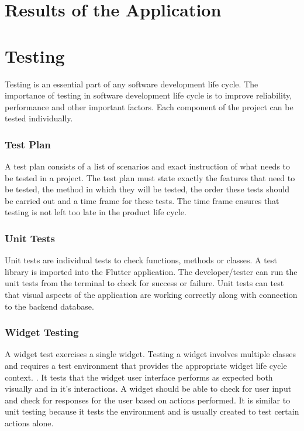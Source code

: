 \section{Results of the Application}

\section{Testing}
Testing is an essential part of any software development life cycle. The importance of testing in software development life cycle is to improve reliability, performance and other important factors.\cite{TestingLifeCycle} Each component of the project can be tested individually.

\subsubsection{Test Plan}
A test plan consists of a list of scenarios and exact instruction of what needs to be tested in a project. The test plan must state exactly the features that need to be tested, the method in which they will be tested, the order these tests should be carried out and a time frame for these tests. The time frame ensures that testing is not left too late in the product life cycle.\cite{testPlan}
 
\subsubsection{Unit Tests}

Unit tests are individual tests to check functions, methods or classes. A test library is imported into the Flutter application. The developer/tester can run the unit tests from the terminal to check for success or failure. Unit tests can test that visual aspects of the application are working correctly along with connection to the backend database.

\subsubsection{Widget Testing}

A widget test exercises a single widget. Testing a widget involves multiple classes and requires a test environment that provides the appropriate widget life cycle context. \cite{testing}. It tests that the widget user interface performs as expected both visually and in it’s interactions. A widget should be able to check for user input and check for responses for the user based on actions performed. It is similar to unit testing because it tests the environment and is usually created to test certain actions alone.

